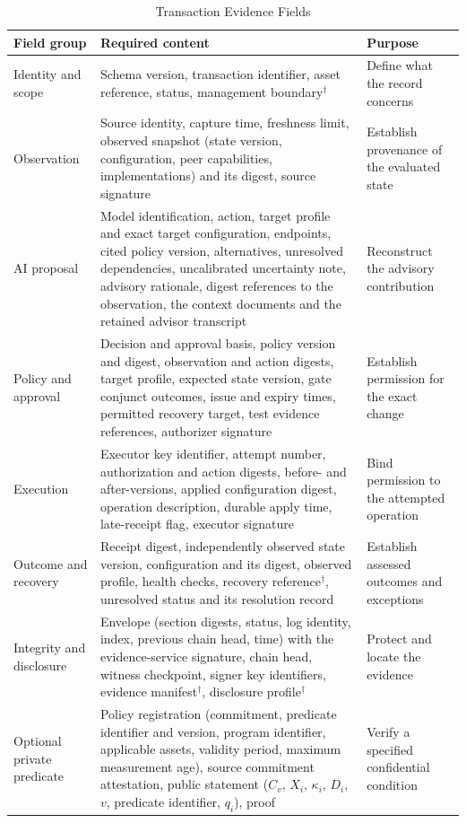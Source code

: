 \begin{table}[!t]
\caption{Transaction Evidence Fields}
\label{tab:fields}
\centering
\footnotesize
\begin{tabular}{>{\raggedright\arraybackslash}p{3.0cm}>{\raggedright\arraybackslash}p{8.4cm}>{\raggedright\arraybackslash}p{4.2cm}}
\toprule
Field group & Required content & Purpose \\
\midrule
Identity and scope & Schema version, transaction identifier, asset reference, status, management boundary$^{\dagger}$ & Define what the record concerns \\
Observation & Source identity, capture time, freshness limit, observed snapshot (state version, configuration, peer capabilities, implementations) and its digest, source signature & Establish provenance of the evaluated state \\
AI proposal & Model identification, action, target profile and exact target configuration, endpoints, cited policy version, alternatives, unresolved dependencies, uncalibrated uncertainty note, advisory rationale, digest references to the observation, the context documents and the retained advisor transcript & Reconstruct the advisory contribution \\
Policy and approval & Decision and approval basis, policy version and digest, observation and action digests, target profile, expected state version, gate conjunct outcomes, issue and expiry times, permitted recovery target, test evidence references, authorizer signature & Establish permission for the exact change \\
Execution & Executor key identifier, attempt number, authorization and action digests, before- and after-versions, applied configuration digest, operation description, durable apply time, late-receipt flag, executor signature & Bind permission to the attempted operation \\
Outcome and recovery & Receipt digest, independently observed state version, configuration and its digest, observed profile, health checks, recovery reference$^{\dagger}$, unresolved status and its resolution record & Establish assessed outcomes and exceptions \\
Integrity and disclosure & Envelope (section digests, status, log identity, index, previous chain head, time) with the evidence-service signature, chain head, witness checkpoint, signer key identifiers, evidence manifest$^{\dagger}$, disclosure profile$^{\dagger}$ & Protect and locate the evidence \\
Optional private predicate & Policy registration (commitment, predicate identifier and version, program identifier, applicable assets, validity period, maximum measurement age), source commitment attestation, public statement ($C_v$, $X_i$, $\kappa_i$, $D_i$, $v$, predicate identifier, $q_i$), proof & Verify a specified confidential condition \\

\end{tabular}
\end{table}
